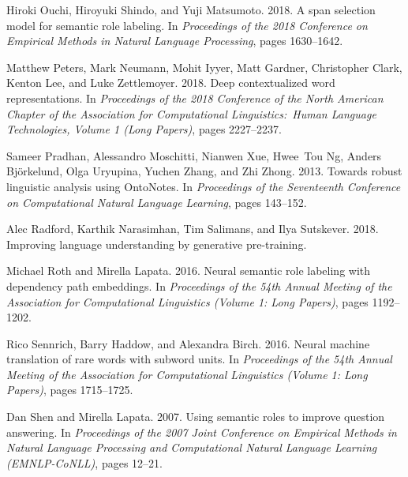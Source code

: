 \documentclass[11pt,a4paper]{article}
\begin{document}
\begin{thebibliography}{25}
Hiroki Ouchi, Hiroyuki Shindo, and Yuji Matsumoto. 2018.
\newblock A span selection model for semantic role labeling.
\newblock In \emph{Proceedings of the 2018 Conference on Empirical Methods in
  Natural Language Processing}, pages 1630--1642.

Matthew Peters, Mark Neumann, Mohit Iyyer, Matt Gardner, Christopher Clark,
  Kenton Lee, and Luke Zettlemoyer. 2018.
\newblock Deep contextualized word representations.
\newblock In \emph{Proceedings of the 2018 Conference of the North American
  Chapter of the Association for Computational Linguistics:\ Human Language
  Technologies, Volume 1 (Long Papers)}, pages 2227--2237.

Sameer Pradhan, Alessandro Moschitti, Nianwen Xue, Hwee~Tou Ng, Anders
  Bj{\"o}rkelund, Olga Uryupina, Yuchen Zhang, and Zhi Zhong. 2013.
\newblock Towards robust linguistic analysis using {OntoNotes}.
\newblock In \emph{Proceedings of the Seventeenth Conference on Computational
  Natural Language Learning}, pages 143--152.

Alec Radford, Karthik Narasimhan, Tim Salimans, and Ilya Sutskever. 2018.
\newblock Improving language understanding by generative pre-training.

Michael Roth and Mirella Lapata. 2016.
\newblock Neural semantic role labeling with dependency path embeddings.
\newblock In \emph{Proceedings of the 54th Annual Meeting of the Association
  for Computational Linguistics (Volume 1: Long Papers)}, pages 1192--1202.

Rico Sennrich, Barry Haddow, and Alexandra Birch. 2016.
\newblock Neural machine translation of rare words with subword units.
\newblock In \emph{Proceedings of the 54th Annual Meeting of the Association
  for Computational Linguistics (Volume 1: Long Papers)}, pages 1715--1725.

Dan Shen and Mirella Lapata. 2007.
\newblock Using semantic roles to improve question answering.
\newblock In \emph{Proceedings of the 2007 Joint Conference on Empirical
  Methods in Natural Language Processing and Computational Natural Language
  Learning (EMNLP-CoNLL)}, pages 12--21.


\end{thebibliography}
\end{document}
